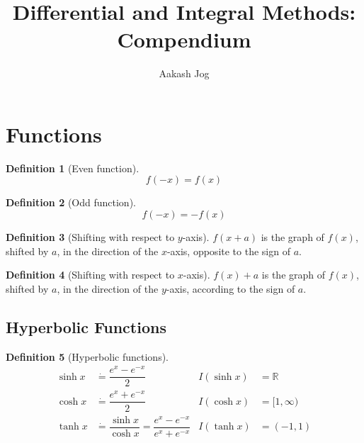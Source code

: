 \documentclass[fleqn, a5paper, 11pt]{article}
\title{Differential and Integral Methods: Compendium}
\author{Aakash Jog}
\theoremstyle{definition}
\newtheorem{definition}{Definition}
\theoremstyle{theorem}
\theoremstyle{remark}
\begin{document}
	
\maketitle


\section{Functions}

\begin{definition}[Even function]
	\begin{equation*}
		f(-x) = f(x)
	\end{equation*}
\end{definition}

\begin{definition}[Odd function]
	\begin{equation*}
	f(-x) = -f(x)
	\end{equation*}
\end{definition}

\begin{definition}[Shifting with respect to $y$-axis]
	$f(x+a)$ is the graph of $f(x)$, shifted by $a$, in the direction of the $x$-axis, opposite to the sign of $a$. \\
\end{definition}

\begin{definition}[Shifting with respect to $x$-axis]
	$f(x) + a$ is the graph of $f(x)$, shifted by $a$, in the direction of the $y$-axis, according to the sign of $a$. \\
\end{definition}

\subsection{Hyperbolic Functions}

\begin{definition}[Hyperbolic functions]
	\begin{align*}
		\sinh x &\dot{=} \dfrac{e^x - e^{-x}}{2}
		& I(\sinh x) &= \mathbb{R}\\
		\cosh x &\dot{=} \dfrac{e^x + e^{-x}}{2}
		& I(\cosh x) &= [1, \infty)\\
		\tanh x &\dot{=} \dfrac{\sinh x}{\cosh x} = \dfrac{e^x - e^{-x}}{e^x + e^{-x}}
		& I(\tanh x) &= (-1, 1)
	\end{align*}
\end{definition}
\end{document}
